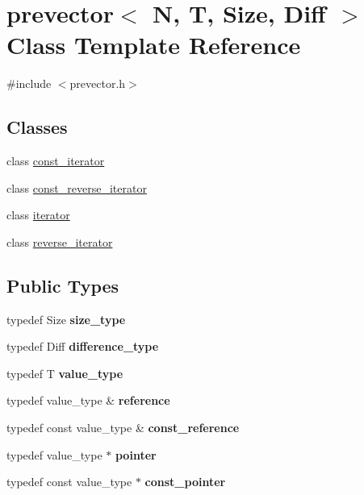 \hypertarget{classprevector}{}\section{prevector$<$ N, T, Size, Diff $>$ Class Template Reference}
\label{classprevector}


{\ttfamily \#include $<$prevector.\+h$>$}

\subsection*{Classes}
\begin{DoxyCompactItemize}
\item 
class \mbox{\hyperlink{classprevector_1_1const__iterator}{const\+\_\+iterator}}
\item 
class \mbox{\hyperlink{classprevector_1_1const__reverse__iterator}{const\+\_\+reverse\+\_\+iterator}}
\item 
class \mbox{\hyperlink{classprevector_1_1iterator}{iterator}}
\item 
class \mbox{\hyperlink{classprevector_1_1reverse__iterator}{reverse\+\_\+iterator}}
\end{DoxyCompactItemize}
\subsection*{Public Types}
\begin{DoxyCompactItemize}
\item 
\mbox{\label{classprevector_a7e0da95e6d1c878f6eeb572f4fc12524}} 
typedef Size {\bfseries size\+\_\+type}
\item 
\mbox{\label{classprevector_a34ad7f610eefb33a8db9161cadf15dbe}} 
typedef Diff {\bfseries difference\+\_\+type}
\item 
\mbox{\label{classprevector_aaab8519e15c3bdebdcc4bbc86fcff33c}} 
typedef T {\bfseries value\+\_\+type}
\item 
\mbox{\label{classprevector_a457464223499e5cad0ab1b8123d82109}} 
typedef value\+\_\+type \& {\bfseries reference}
\item 
\mbox{\label{classprevector_a381a4d3f4c3f74fde0c92ef21e755ef4}} 
typedef const value\+\_\+type \& {\bfseries const\+\_\+reference}
\item 
\mbox{\label{classprevector_ad9c63f0c4a27f8a3c1fc71e153cb93ad}} 
typedef value\+\_\+type $\ast$ {\bfseries pointer}
\item 
\mbox{\label{classprevector_ae322a41a56ba4c7aad96a2270b9f34fc}} 
typedef const value\+\_\+type $\ast$ {\bfseries const\+\_\+pointer}
\end{DoxyCompactItemize}
